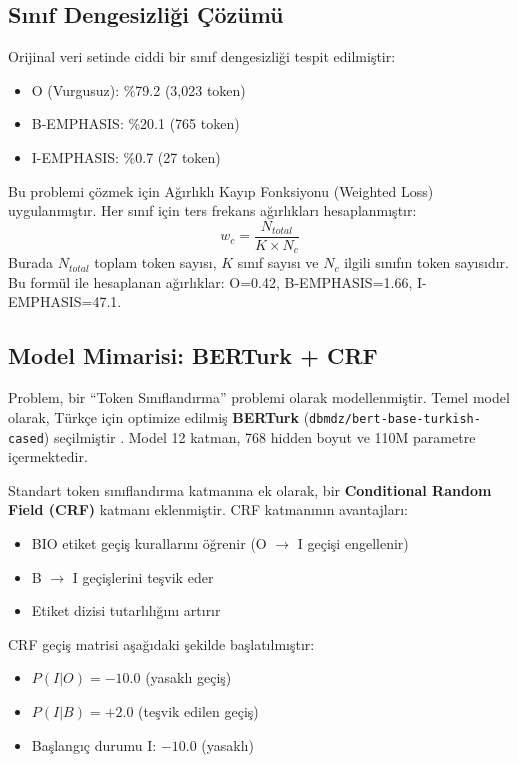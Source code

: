 \documentclass[conference]{IEEEtran}
\begin{document}
\subsection{Sınıf Dengesizliği Çözümü}
Orijinal veri setinde ciddi bir sınıf dengesizliği tespit edilmiştir:
\begin{itemize}
    \item O (Vurgusuz): \%79.2 (3,023 token)
    \item B-EMPHASIS: \%20.1 (765 token)
    \item I-EMPHASIS: \%0.7 (27 token)
\end{itemize}

Bu problemi çözmek için Ağırlıklı Kayıp Fonksiyonu (Weighted Loss) uygulanmıştır. Her sınıf için ters frekans ağırlıkları hesaplanmıştır:
\begin{equation}
w_c = \frac{N_{total}}{K \times N_c}
\end{equation}
Burada $N_{total}$ toplam token sayısı, $K$ sınıf sayısı ve $N_c$ ilgili sınıfın token sayısıdır. Bu formül ile hesaplanan ağırlıklar: O=0.42, B-EMPHASIS=1.66, I-EMPHASIS=47.1.

\subsection{Model Mimarisi: BERTurk + CRF}
Problem, bir ``Token Sınıflandırma'' problemi olarak modellenmiştir. Temel model olarak, Türkçe için optimize edilmiş \textbf{BERTurk} (\texttt{dbmdz/bert-base-turkish-cased}) seçilmiştir \cite{stefanit}. Model 12 katman, 768 hidden boyut ve 110M parametre içermektedir.


Standart token sınıflandırma katmanına ek olarak, bir \textbf{Conditional Random Field (CRF)} katmanı eklenmiştir. CRF katmanının avantajları:
\begin{itemize}
    \item BIO etiket geçiş kurallarını öğrenir (O $\rightarrow$ I geçişi engellenir)
    \item B $\rightarrow$ I geçişlerini teşvik eder
    \item Etiket dizisi tutarlılığını artırır
\end{itemize}

CRF geçiş matrisi aşağıdaki şekilde başlatılmıştır:
\begin{itemize}
    \item $P(I | O) = -10.0$ (yasaklı geçiş)
    \item $P(I | B) = +2.0$ (teşvik edilen geçiş)
    \item Başlangıç durumu I: $-10.0$ (yasaklı)
\end{itemize}
\end{document}
